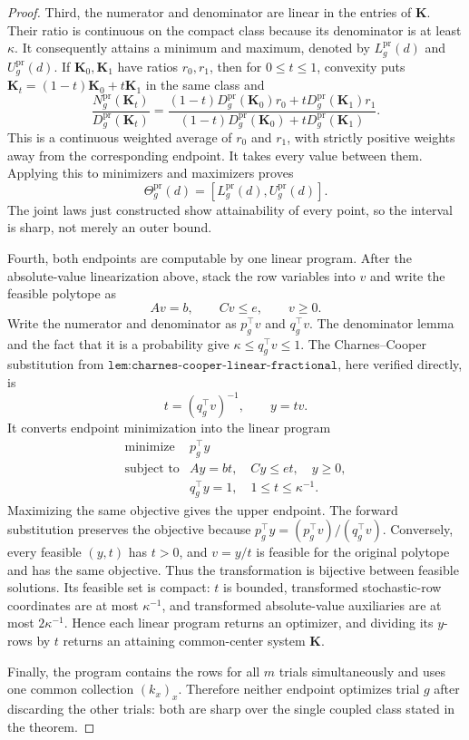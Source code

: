 \documentclass{article}
\begin{document}
\begin{proof}
Third, the numerator and denominator are linear in the entries of \(\mathbf K\).  Their ratio is continuous on the compact class because its denominator is at least \(\kappa\).  It consequently attains a minimum and maximum, denoted by \(L_g^{\mathrm{pr}}(d)\) and \(U_g^{\mathrm{pr}}(d)\).  If \(\mathbf K_0,\mathbf K_1\) have ratios \(r_0,r_1\), then for \(0\le t\le1\), convexity puts \(\mathbf K_t=(1-t)\mathbf K_0+t\mathbf K_1\) in the same class and
\[
 \frac{N_g^{\mathrm{pr}}(\mathbf K_t)}{D_g^{\mathrm{pr}}(\mathbf K_t)}
 =\frac{(1-t)D_g^{\mathrm{pr}}(\mathbf K_0)r_0+tD_g^{\mathrm{pr}}(\mathbf K_1)r_1}
 {(1-t)D_g^{\mathrm{pr}}(\mathbf K_0)+tD_g^{\mathrm{pr}}(\mathbf K_1)}.
\]
This is a continuous weighted average of \(r_0\) and \(r_1\), with strictly positive weights away from the corresponding endpoint.  It takes every value between them.  Applying this to minimizers and maximizers proves
\[
 \Theta_g^{\mathrm{pr}}(d)=[L_g^{\mathrm{pr}}(d),U_g^{\mathrm{pr}}(d)].
\]
The joint laws just constructed show attainability of every point, so the interval is sharp, not merely an outer bound.

Fourth, both endpoints are computable by one linear program.  After the absolute-value linearization above, stack the row variables into \(v\) and write the feasible polytope as
\[
 Av=b,\qquad Cv\le e,\qquad v\ge0.
\]
Write the numerator and denominator as \(p_g^{\top}v\) and \(q_g^{\top}v\).  The denominator lemma and the fact that it is a probability give
\(\kappa\le q_g^{\top}v\le1\).  The Charnes--Cooper substitution from \(\texttt{lem:charnes-cooper-linear-fractional}\), here verified directly, is
\[
 t=(q_g^{\top}v)^{-1},\qquad y=tv.
\]
It converts endpoint minimization into the linear program
\[
 \begin{array}{ll}
 \text{minimize}&p_g^{\top}y\\
 \text{subject to}&Ay=bt,\quad Cy\le et,\quad y\ge0,\\
 &q_g^{\top}y=1,\quad 1\le t\le\kappa^{-1}.
 \end{array}
\]
Maximizing the same objective gives the upper endpoint.  The forward substitution preserves the objective because \(p_g^{\top}y=(p_g^{\top}v)/(q_g^{\top}v)\).  Conversely, every feasible \((y,t)\) has \(t>0\), and \(v=y/t\) is feasible for the original polytope and has the same objective.  Thus the transformation is bijective between feasible solutions.  Its feasible set is compact: \(t\) is bounded, transformed stochastic-row coordinates are at most \(\kappa^{-1}\), and transformed absolute-value auxiliaries are at most \(2\kappa^{-1}\).  Hence each linear program returns an optimizer, and dividing its \(y\)-rows by \(t\) returns an attaining common-center system \(\mathbf K\).

Finally, the program contains the rows for all \(m\) trials simultaneously and uses one common collection \((k_x)_x\).  Therefore neither endpoint optimizes trial \(g\) after discarding the other trials: both are sharp over the single coupled class stated in the theorem.
\end{proof}
\end{document}
